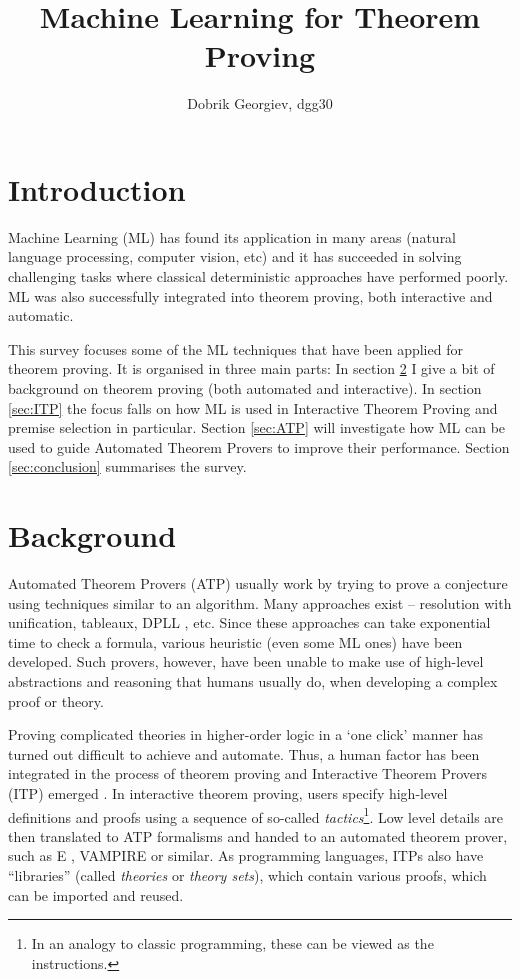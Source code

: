 \documentclass{article}
\title{Machine Learning for Theorem Proving}
\author{Dobrik Georgiev, dgg30}
\begin{document}
\maketitle
\section{Introduction}

Machine Learning (ML) has found its application in many areas (natural language
processing, computer vision, etc) and it has succeeded in solving challenging
tasks where classical deterministic approaches have performed poorly. ML was
also successfully integrated into theorem proving, both interactive and
automatic. 

This survey focuses some of the ML techniques that have been applied for
theorem proving. It is organised in three main parts:
In section \ref{sec:background} I give a bit of background on theorem proving
(both automated and interactive). In section \ref{sec:ITP} the focus falls on
how ML is used in Interactive Theorem Proving and premise selection in
particular. Section \ref{sec:ATP} will investigate how ML can be used to guide
Automated Theorem Provers to improve their performance. Section
\ref{sec:conclusion} summarises the survey.


\section{Background}\label{sec:background}

Automated Theorem Provers (ATP) usually work by trying to prove a conjecture
using techniques similar to an algorithm. Many approaches exist -- resolution
with unification, tableaux, DPLL \citep{DPLL}, etc. Since these approaches can
take exponential time to check a formula, various heuristic (even some ML ones)
have been developed. Such provers, however, have been unable to make use of
high-level abstractions and reasoning that humans usually do, when developing
a complex proof or theory.

Proving complicated theories in higher-order logic in a `one click' manner has
turned out difficult to achieve and automate. Thus, a human factor has been
integrated in the process of theorem proving and Interactive Theorem Provers
(ITP) emerged \citep{HistoryITP}. In interactive theorem proving, users specify
high-level definitions and proofs using a sequence of so-called
\textit{tactics}\footnote{In an analogy to classic programming, these can be
viewed as the instructions.}. Low level details are then translated to ATP
formalisms and handed to an automated theorem prover, such as
E \citep{Eprover}, VAMPIRE \citep{VAMPIRE} or similar. As programming
languages, ITPs also have ``libraries'' (called \emph{theories} or \emph{theory
sets}), which contain various proofs, which can be imported and reused.
\end{document}
